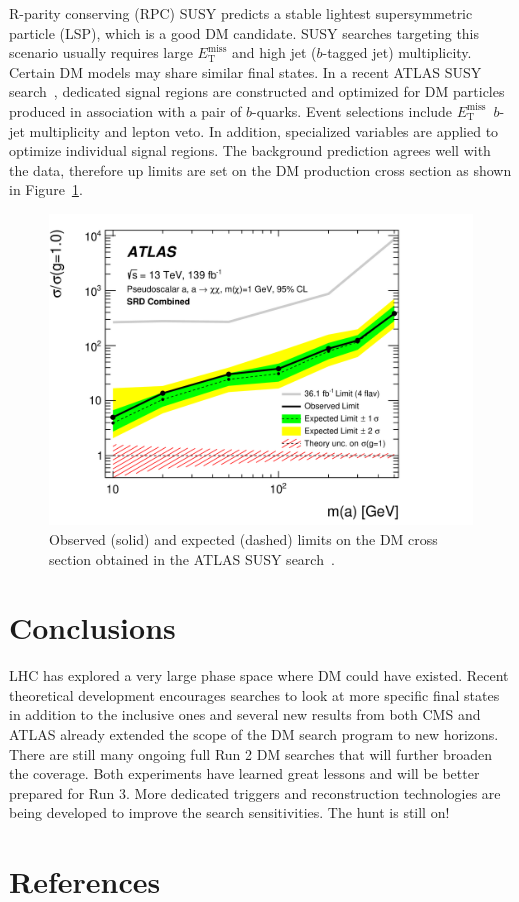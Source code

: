 \documentclass{moriond}
\def\et{E_\mathrm{T}^{\mathrm{miss}}}
\begin{document}
R-parity conserving (RPC) SUSY predicts a stable lightest supersymmetric particle (LSP), which is a good DM candidate. SUSY searches targeting this
scenario usually requires large $\et$ and high jet ($b$-tagged jet)
multiplicity. Certain DM models may share similar final states. In a recent
ATLAS SUSY search~\cite{dmbb}, dedicated signal regions are constructed and
optimized for DM particles produced in association with a pair of $b$-quarks. Event selections include $\et$\, $b$-jet multiplicity and lepton veto. In addition, specialized variables are applied to optimize individual signal regions. The background prediction agrees well with the data, therefore up limits are set on the DM production cross section as shown in Figure~\ref{fig:dmbb}.   

\begin{figure} [htb]
\centerline{\includegraphics[width=0.5\linewidth]{DMBB}}
\caption[]{Observed (solid) and expected (dashed) limits on the DM cross section obtained in the ATLAS SUSY search~\cite{dmbb}.}
\label{fig:dmbb}
\end{figure}

\section{Conclusions}

LHC has explored a very large phase space where DM could have existed.
Recent theoretical development encourages searches to look at more specific
final states in addition to the inclusive ones and several new results from
both CMS and ATLAS already extended the scope of the DM search program to new
horizons. There are still many ongoing full Run 2 DM searches that will further
broaden the coverage. Both experiments have learned great lessons and will be better prepared for Run 3. More dedicated triggers and reconstruction technologies are being developed to improve the search sensitivities. The hunt is still on!

\section*{References}
\end{document}
